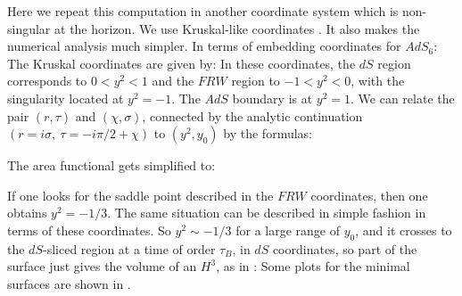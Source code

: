 Here we repeat this computation in another coordinate system which is non-singular at the 
horizon. 
We use Kruskal-like coordinates  . It also makes the numerical analysis much simpler. In terms of embedding coordinates for $AdS_6$:
\eqn{}
The Kruskal coordinates are given by:
\eqn{}
In these coordinates, the $dS$ region corresponds to $0<y^2<1$ and the $FRW$ region to $-1<y^2<0$, with the singularity located at $y^2=-1$. The $AdS$ boundary is at $y^2=1$. 
We can relate the pair $(r, \tau)$ and $(\chi, \sigma)$, connected by the analytic continuation $(r=i\sigma ,~\tau=-i\pi/2+\chi)$ to $(y^2, y_0)$ by the formulas:
\eqn{}

The area functional gets simplified to:
\eqn{}
\ifig{} {}

If one looks for the saddle point described in the $FRW$ coordinates, then one obtains $y^2=-1/3$. The same situation can be described in simple fashion in terms of these coordinates.
So $y^2\sim -1/3 $ for a large range of $y_0$, and it crosses to the $dS$-sliced region at a time of order $\tau_B$, in $dS$ coordinates, so part of the surface just gives the volume of an $H^3$, as in \valacr:
\eqn{}
Some plots for the minimal surfaces are shown in \plotthree . 

\listrefs
\bye 